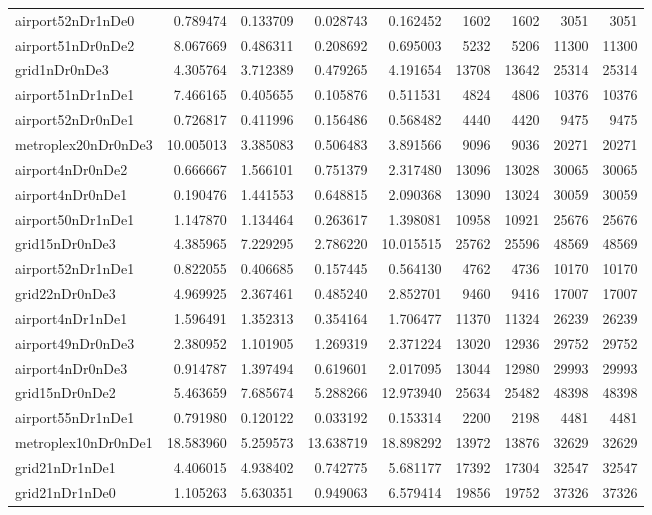 \begin{longtable}{|l|r|r|r|r|r|r|r|r|}
airport52nDr1nDe0 & 0.789474 & 0.133709 & 0.028743 & 0.162452 & 1602 & 1602 & 3051 & 3051 \\
airport51nDr0nDe2 & 8.067669 & 0.486311 & 0.208692 & 0.695003 & 5232 & 5206 & 11300 & 11300 \\
grid1nDr0nDe3 & 4.305764 & 3.712389 & 0.479265 & 4.191654 & 13708 & 13642 & 25314 & 25314 \\
airport51nDr1nDe1 & 7.466165 & 0.405655 & 0.105876 & 0.511531 & 4824 & 4806 & 10376 & 10376 \\
airport52nDr0nDe1 & 0.726817 & 0.411996 & 0.156486 & 0.568482 & 4440 & 4420 & 9475 & 9475 \\
metroplex20nDr0nDe3 & 10.005013 & 3.385083 & 0.506483 & 3.891566 & 9096 & 9036 & 20271 & 20271 \\
airport4nDr0nDe2 & 0.666667 & 1.566101 & 0.751379 & 2.317480 & 13096 & 13028 & 30065 & 30065 \\
airport4nDr0nDe1 & 0.190476 & 1.441553 & 0.648815 & 2.090368 & 13090 & 13024 & 30059 & 30059 \\
airport50nDr1nDe1 & 1.147870 & 1.134464 & 0.263617 & 1.398081 & 10958 & 10921 & 25676 & 25676 \\
grid15nDr0nDe3 & 4.385965 & 7.229295 & 2.786220 & 10.015515 & 25762 & 25596 & 48569 & 48569 \\
airport52nDr1nDe1 & 0.822055 & 0.406685 & 0.157445 & 0.564130 & 4762 & 4736 & 10170 & 10170 \\
grid22nDr0nDe3 & 4.969925 & 2.367461 & 0.485240 & 2.852701 & 9460 & 9416 & 17007 & 17007 \\
airport4nDr1nDe1 & 1.596491 & 1.352313 & 0.354164 & 1.706477 & 11370 & 11324 & 26239 & 26239 \\
airport49nDr0nDe3 & 2.380952 & 1.101905 & 1.269319 & 2.371224 & 13020 & 12936 & 29752 & 29752 \\
airport4nDr0nDe3 & 0.914787 & 1.397494 & 0.619601 & 2.017095 & 13044 & 12980 & 29993 & 29993 \\
grid15nDr0nDe2 & 5.463659 & 7.685674 & 5.288266 & 12.973940 & 25634 & 25482 & 48398 & 48398 \\
airport55nDr1nDe1 & 0.791980 & 0.120122 & 0.033192 & 0.153314 & 2200 & 2198 & 4481 & 4481 \\
metroplex10nDr0nDe1 & 18.583960 & 5.259573 & 13.638719 & 18.898292 & 13972 & 13876 & 32629 & 32629 \\
grid21nDr1nDe1 & 4.406015 & 4.938402 & 0.742775 & 5.681177 & 17392 & 17304 & 32547 & 32547 \\
grid21nDr1nDe0 & 1.105263 & 5.630351 & 0.949063 & 6.579414 & 19856 & 19752 & 37326 & 37326 \\

\end{longtable}

